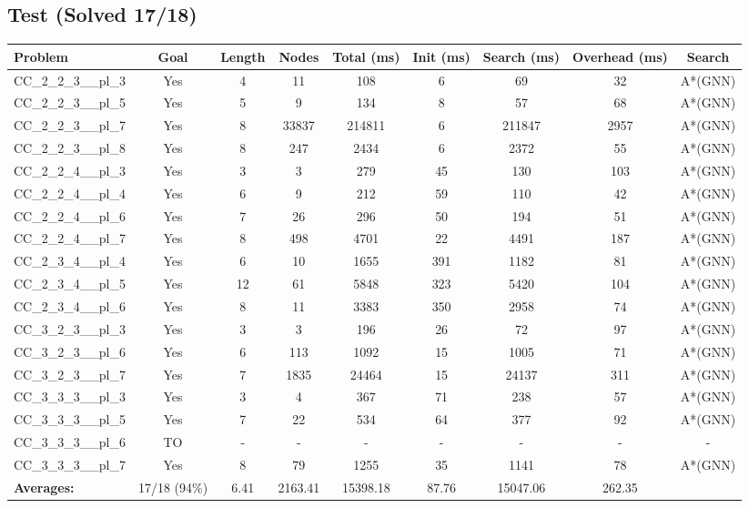 \documentclass{article}
\begin{document}
\subsection*{Test (Solved 17/18)}
\begin{tabular}{lcccccccc}
\toprule
Problem & Goal & Length & Nodes & Total (ms) & Init (ms) & Search (ms) & Overhead (ms) & Search \\
\midrule
CC\_2\_2\_3\_\_pl\_3 & Yes & 4 & 11 & 108 & 6 & 69 & 32 & A*(GNN) \\
CC\_2\_2\_3\_\_pl\_5 & Yes & 5 & 9 & 134 & 8 & 57 & 68 & A*(GNN) \\
CC\_2\_2\_3\_\_pl\_7 & Yes & 8 & 33837 & 214811 & 6 & 211847 & 2957 & A*(GNN) \\
CC\_2\_2\_3\_\_pl\_8 & Yes & 8 & 247 & 2434 & 6 & 2372 & 55 & A*(GNN) \\
CC\_2\_2\_4\_\_pl\_3 & Yes & 3 & 3 & 279 & 45 & 130 & 103 & A*(GNN) \\
CC\_2\_2\_4\_\_pl\_4 & Yes & 6 & 9 & 212 & 59 & 110 & 42 & A*(GNN) \\
CC\_2\_2\_4\_\_pl\_6 & Yes & 7 & 26 & 296 & 50 & 194 & 51 & A*(GNN) \\
CC\_2\_2\_4\_\_pl\_7 & Yes & 8 & 498 & 4701 & 22 & 4491 & 187 & A*(GNN) \\
CC\_2\_3\_4\_\_pl\_4 & Yes & 6 & 10 & 1655 & 391 & 1182 & 81 & A*(GNN) \\
CC\_2\_3\_4\_\_pl\_5 & Yes & 12 & 61 & 5848 & 323 & 5420 & 104 & A*(GNN) \\
CC\_2\_3\_4\_\_pl\_6 & Yes & 8 & 11 & 3383 & 350 & 2958 & 74 & A*(GNN) \\
CC\_3\_2\_3\_\_pl\_3 & Yes & 3 & 3 & 196 & 26 & 72 & 97 & A*(GNN) \\
CC\_3\_2\_3\_\_pl\_6 & Yes & 6 & 113 & 1092 & 15 & 1005 & 71 & A*(GNN) \\
CC\_3\_2\_3\_\_pl\_7 & Yes & 7 & 1835 & 24464 & 15 & 24137 & 311 & A*(GNN) \\
CC\_3\_3\_3\_\_pl\_3 & Yes & 3 & 4 & 367 & 71 & 238 & 57 & A*(GNN) \\
CC\_3\_3\_3\_\_pl\_5 & Yes & 7 & 22 & 534 & 64 & 377 & 92 & A*(GNN) \\
CC\_3\_3\_3\_\_pl\_6 & TO & - & - & - & - & - & - & - \\
CC\_3\_3\_3\_\_pl\_7 & Yes & 8 & 79 & 1255 & 35 & 1141 & 78 & A*(GNN) \\
\textbf{Averages:} & 17/18 (94\%) & 6.41 & 2163.41 & 15398.18 & 87.76 & 15047.06 & 262.35 & \\
\bottomrule
\end{tabular}
\\[0.7cm]
\end{document}
